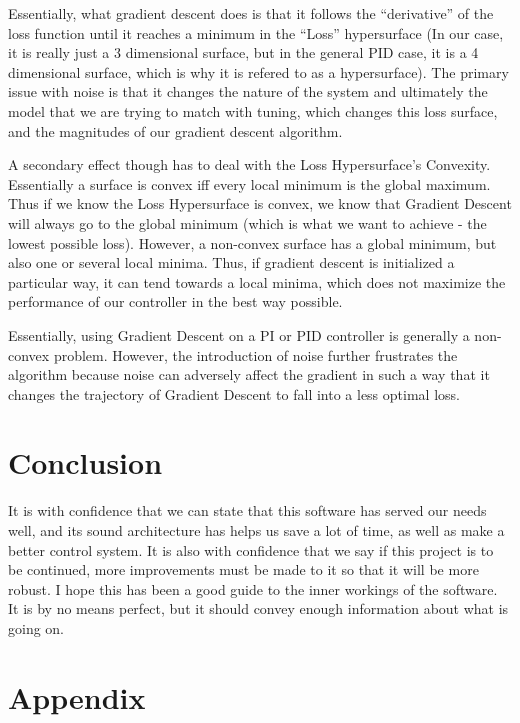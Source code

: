 \documentclass[letterpaper]{article}
\begin{document}
Essentially, what gradient descent does is that it follows the ``derivative'' of the loss function until it reaches a minimum in the ``Loss'' hypersurface (In our case, it is really just a 3 dimensional surface, but in the general PID case, it is a 4 dimensional surface, which is why it is refered to as a hypersurface). The primary issue with noise is that it changes the nature of the system and ultimately the model that we are trying to match with tuning, which changes this loss surface, and the magnitudes of our gradient descent algorithm.

A secondary effect though has to deal with the Loss Hypersurface's Convexity. Essentially a surface is convex iff every local minimum is the global maximum. Thus if we know the Loss Hypersurface is convex, we know that Gradient Descent will always go to the global minimum (which is what we want to achieve - the lowest possible loss). However, a non-convex surface has a global minimum, but also one or several local minima. Thus, if gradient descent is initialized a particular way, it can tend towards a local minima, which does not maximize the performance of our controller in the best way possible.

Essentially, using Gradient Descent on a PI or PID controller is generally a non-convex problem. However, the introduction of noise further frustrates the algorithm because noise can adversely affect the gradient in such a way that it changes the trajectory of Gradient Descent to fall into a less optimal loss.

\newpage

\section{Conclusion}

It is with confidence that we can state that this software has served our needs well, and its sound architecture has helps us save a lot of time, as well as make a better control system. It is also with confidence that we say if this project is to be continued, more improvements must be made to it so that it will be more robust. I hope this has been a good guide to the inner workings of the software. It is by no means perfect, but it should convey enough information about what is going on.

\newpage

\section{Appendix}
\end{document}
